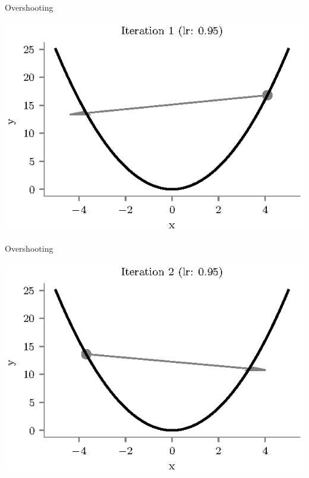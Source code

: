 \documentclass{beamer}
\begin{document}
\begin{frame}{Overshooting}
\begin{center}
\includegraphics[totalheight=6cm]{gradient-descent/overshooting-1.eps}
\end{center}
\end{frame}

\begin{frame}{Overshooting}
\begin{center}
\includegraphics[totalheight=6cm]{gradient-descent/overshooting-2.eps}
\end{center}
\end{frame}
\end{document}
